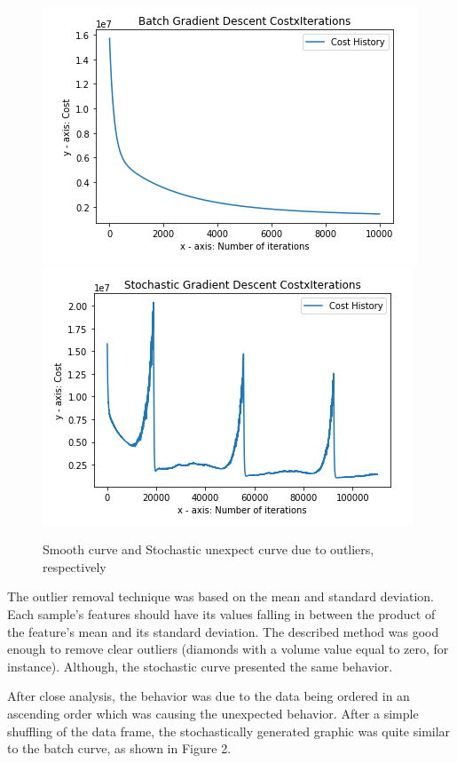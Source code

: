 \documentclass[conference]{IEEEtran}
\begin{document}
	\begin{figure}[!h]
      \centering
      \includegraphics[scale=0.28]{images/smooth-gd-curve.png}
      \includegraphics[scale=0.28]{images/steep-curves-in-stochastic-gd.png}
      \caption{Smooth curve and Stochastic unexpect curve due to outliers, respectively}
      \label{fig1}
  \end{figure}
	
    The outlier removal technique was based on the mean and standard deviation. Each sample's features should have its values falling in between the product of the feature's mean and its standard deviation. The described method was good enough to remove clear outliers (diamonds with a volume value equal to zero, for instance). Although, the stochastic curve presented the same behavior.
    
    After close analysis, the behavior was due to the data being ordered in an ascending order which was causing the unexpected behavior. After a simple shuffling of the data frame, the stochastically generated graphic was quite similar to the batch curve, as shown in Figure 2.
	
\end{document}
